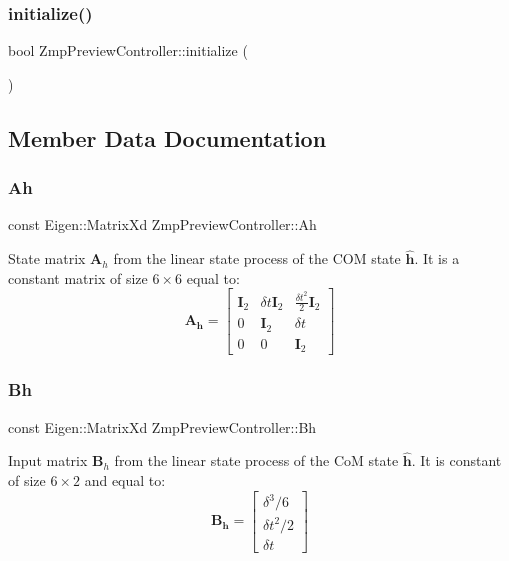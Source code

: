 \subsubsection{\texorpdfstring{initialize()}{initialize()}}
{\footnotesize\ttfamily bool Zmp\+Preview\+Controller\+::initialize (\begin{DoxyParamCaption}{ }\end{DoxyParamCaption})}



\subsection{Member Data Documentation}
\hypertarget{classZmpPreviewController_a8ee8ec415e25374f4fa687f5a5a6b9df}{}\label{classZmpPreviewController_a8ee8ec415e25374f4fa687f5a5a6b9df} 
\subsubsection{\texorpdfstring{Ah}{Ah}}
{\footnotesize\ttfamily const Eigen\+::\+Matrix\+Xd Zmp\+Preview\+Controller\+::\+Ah\hspace{0.3cm}{\ttfamily [private]}}

State matrix $\mathbf{A}_h$ from the linear state process of the C\+OM state $\hat{\mathbf{h}}$. It is a constant matrix of size $6\times6$ equal to\+: \[ \mathbf{A_h} = \left[ \begin{array}{ccc} \mathbf{I}_2 & \delta t \mathbf{I}_2 & \frac{\delta t^2}{2} \mathbf{I}_2 \\ 0 & \mathbf{I}_2 & \delta t \\ 0 & 0 & \mathbf{I}_2 \end{array} \right] \] \hypertarget{classZmpPreviewController_a98bd07d03d0a6004b345ef4310cf17b6}{}\label{classZmpPreviewController_a98bd07d03d0a6004b345ef4310cf17b6} 
\subsubsection{\texorpdfstring{Bh}{Bh}}
{\footnotesize\ttfamily const Eigen\+::\+Matrix\+Xd Zmp\+Preview\+Controller\+::\+Bh\hspace{0.3cm}{\ttfamily [private]}}

Input matrix $\mathbf{B}_h$ from the linear state process of the CoM state $\hat{\mathbf{h}}$. It is constant of size $6\times2$ and equal to\+: \[ \mathbf{B_h} = \left[ \begin{array}{c} \delta^3/6 \\ \delta t^2/2 \\ \delta t \end{array} \right] \] \hypertarget{classZmpPreviewController_a2093754713ffb2a7adcd1310c73bf775}{}\label{classZmpPreviewController_a2093754713ffb2a7adcd1310c73bf775} 
